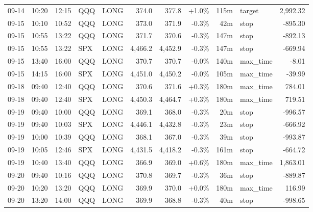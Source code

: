 \documentclass[11pt,a4paper,twoside]{article}
\begin{document}
\begin{center}
\begin{longtable}{>{\color{txtmain}}l l l l l r r r r >{\color{txtmain}}l r}
09-14 & 10:20 & 12:15 & QQQ & LONG & 374.0 & 377.8 & \textcolor{wingreen}{+1.0\%} & 115m & target & \textcolor{wingreen}{2,992.32} \\
09-15 & 10:10 & 10:52 & QQQ & LONG & 373.0 & 371.9 & \textcolor{lossred}{-0.3\%} & 42m & stop & \textcolor{lossred}{-895.30} \\
09-15 & 10:55 & 13:22 & QQQ & LONG & 371.7 & 370.6 & \textcolor{lossred}{-0.3\%} & 147m & stop & \textcolor{lossred}{-892.13} \\
09-15 & 10:55 & 13:22 & SPX & LONG & 4,466.2 & 4,452.9 & \textcolor{lossred}{-0.3\%} & 147m & stop & \textcolor{lossred}{-669.94} \\
09-15 & 13:40 & 16:00 & QQQ & LONG & 370.7 & 370.7 & \textcolor{lossred}{-0.0\%} & 140m & max\_time & \textcolor{lossred}{-8.01} \\
09-15 & 14:15 & 16:00 & SPX & LONG & 4,451.0 & 4,450.2 & \textcolor{lossred}{-0.0\%} & 105m & max\_time & \textcolor{lossred}{-39.99} \\
09-18 & 09:40 & 12:40 & QQQ & LONG & 370.6 & 371.6 & \textcolor{wingreen}{+0.3\%} & 180m & max\_time & \textcolor{wingreen}{784.01} \\
09-18 & 09:40 & 12:40 & SPX & LONG & 4,450.3 & 4,464.7 & \textcolor{wingreen}{+0.3\%} & 180m & max\_time & \textcolor{wingreen}{719.51} \\
09-19 & 09:40 & 10:00 & QQQ & LONG & 369.1 & 368.0 & \textcolor{lossred}{-0.3\%} & 20m & stop & \textcolor{lossred}{-996.57} \\
09-19 & 09:40 & 10:03 & SPX & LONG & 4,446.1 & 4,432.8 & \textcolor{lossred}{-0.3\%} & 23m & stop & \textcolor{lossred}{-666.92} \\
09-19 & 10:00 & 10:39 & QQQ & LONG & 368.1 & 367.0 & \textcolor{lossred}{-0.3\%} & 39m & stop & \textcolor{lossred}{-993.87} \\
09-19 & 10:05 & 12:46 & SPX & LONG & 4,431.5 & 4,418.2 & \textcolor{lossred}{-0.3\%} & 161m & stop & \textcolor{lossred}{-664.72} \\
09-19 & 10:40 & 13:40 & QQQ & LONG & 366.9 & 369.0 & \textcolor{wingreen}{+0.6\%} & 180m & max\_time & \textcolor{wingreen}{1,863.01} \\
09-20 & 09:40 & 10:16 & QQQ & LONG & 370.8 & 369.7 & \textcolor{lossred}{-0.3\%} & 36m & stop & \textcolor{lossred}{-889.87} \\
09-20 & 10:20 & 13:20 & QQQ & LONG & 369.9 & 370.0 & \textcolor{wingreen}{+0.0\%} & 180m & max\_time & \textcolor{wingreen}{116.99} \\
09-20 & 13:20 & 14:00 & QQQ & LONG & 369.9 & 368.8 & \textcolor{lossred}{-0.3\%} & 40m & stop & \textcolor{lossred}{-998.65} \\

\end{longtable}
\end{center}
\end{document}
